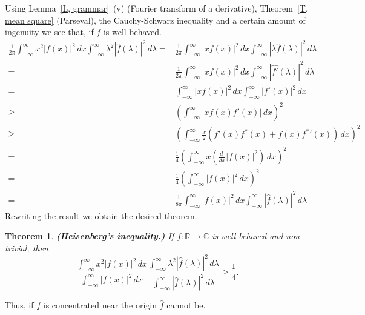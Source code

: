 \documentclass[12pt]{article}
\newtheorem{theorem}{Theorem}[section]
\theoremstyle{definition}
\begin{document}
Using Lemma~\ref{L, grammar}~(v) (Fourier transform of a derivative), 
Theorem~\ref{T, mean square} (Parseval), the Cauchy-Schwarz inequality
and a certain amount of ingenuity we see that, if $f$ is well behaved.
\begin{align*}
\frac{1}{2\pi}\int_{-\infty}^{\infty}x^{2}|f(x)|^{2}\,dx
\int_{-\infty}^{\infty}\lambda^{2}|\hat{f}(\lambda)|^{2}\,d\lambda
=&\frac{1}{2\pi}\int_{-\infty}^{\infty}|xf(x)|^{2}\,dx
\int_{-\infty}^{\infty}|\lambda \hat{f}(\lambda)|^{2}\,d\lambda\\
=&\frac{1}{2\pi}\int_{-\infty}^{\infty}|xf(x)|^{2}\,dx
\int_{-\infty}^{\infty}|\widehat{f'}(\lambda)|^{2}\,d\lambda\\
=&\int_{-\infty}^{\infty}|xf(x)|^{2}\,dx
\int_{-\infty}^{\infty}|f'(x)|^{2}\,dx\\
\geq&\left(\int_{-\infty}^{\infty}|xf(x)f'(x)|\,dx\right)^{2}\\
\geq&\left(\int_{-\infty}^{\infty}
\frac{x}{2}(f'(x)f^{*}(x)+f(x){f^{*}}'(x))\,dx\right)^{2}\\
=&\frac{1}{4}\left(\int_{-\infty}^{\infty}
x\left(\frac{d\ }{dx}|f(x)|^{2}\right)\,dx\right)^{2}\\
=&\frac{1}{4}\left(\int_{-\infty}^{\infty}
|f(x)|^{2}\,dx\right)^{2}\\
=&\frac{1}{8\pi}\int_{-\infty}^{\infty}|f(x)|^{2}\,dx
\int_{-\infty}^{\infty}|\hat{f}(\lambda)|^{2}\,d\lambda
\end{align*}
Rewriting the result we obtain the desired theorem.
\begin{theorem}{\bf (Heisenberg's inequality.)}
If $f:{\mathbb R}\rightarrow{\mathbb C}$
is well behaved and non-trivial, then
\[\frac{\int_{-\infty}^{\infty}x^{2}|f(x)|^{2}\,dx}
{\int_{-\infty}^{\infty}|f(x)|^{2}\,dx}
\frac{\int_{-\infty}^{\infty}\lambda^{2}|\hat{f}(\lambda)|^{2}\,d\lambda}
{\int_{-\infty}^{\infty}|\hat{f}(\lambda)|^{2}\,d\lambda}
\geq\frac{1}{4}.\]
\end{theorem}
Thus, if $f$ is concentrated near the origin $\hat{f}$
cannot be.
\end{document}
